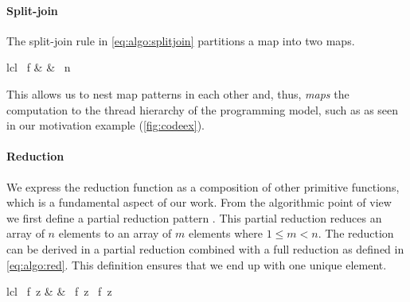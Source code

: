 \paragraph{Split-join}
The split-join rule in \autoref{eq:algo:splitjoin} partitions a map into two maps.
%
\begin{rerule}{lcl}
  \ f
    & \rightarrow &
        \circ {}
        \circ {}\ n
  \label{eq:algo:splitjoin}
\end{rerule}
%
This allows us to nest map patterns in each other and, thus, \emph{maps} the computation to the thread hierarchy of the \OpenCL programming model, such as  as seen in our motivation example (\autoref{fig:codeex}).


\paragraph{Reduction}
We express the reduction function as a composition of other primitive functions, which is a fundamental aspect of our work.
From the algorithmic point of view we first define a partial reduction pattern .
This partial reduction reduces an array of $n$ elements to an array of $m$ elements where $1 \leq m < n$.
The reduction can be derived in a partial reduction combined with a full reduction as defined in \autoref{eq:algo:red}.
This definition ensures that we end up with one unique element.
%
\begin{rerule}{lcl}
  \ f\ z
    & \rightarrow &
      \ f\ z \circ {}\ f\ z
  \label{eq:algo:red}
\end{rerule}

